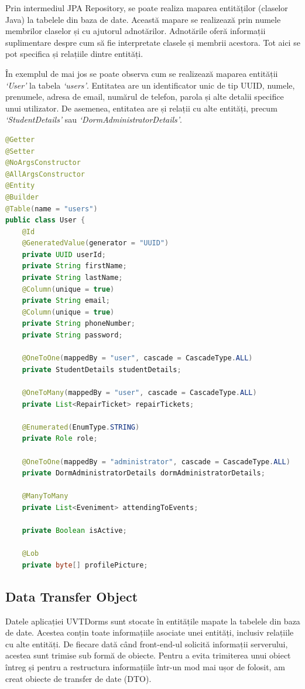 \documentclass[12pt,a4paper]{report}
\theoremstyle{definition}
\theoremstyle{remark}
\begin{document}
\par Prin intermediul JPA Repository, se poate realiza maparea entităților (claselor Java) la tabelele din baza de date. Această mapare se realizează prin numele membrilor claselor și cu ajutorul adnotărilor. Adnotările oferă informații suplimentare despre cum să fie interpretate clasele și membrii acestora. Tot aici se pot specifica și relațiile dintre entități.

\par În exemplul de mai jos se poate observa cum se realizează maparea entității \textit{`User'} la tabela \textit{`users'}. Entitatea are un identificator unic de tip UUID, numele, prenumele, adresa de email, numărul de telefon, parola și alte detalii specifice unui utilizator. De asemenea, entitatea are și relații cu alte entități, precum \textit{`StudentDetails'} sau \textit{`DormAdministratorDetails'}.

\begin{lstlisting}[language=Java, caption={Clasa User}]
@Getter
@Setter
@NoArgsConstructor
@AllArgsConstructor
@Entity
@Builder
@Table(name = "users")
public class User {
    @Id
    @GeneratedValue(generator = "UUID")
    private UUID userId;
    private String firstName;
    private String lastName;
    @Column(unique = true)
    private String email;
    @Column(unique = true)
    private String phoneNumber;
    private String password;

    @OneToOne(mappedBy = "user", cascade = CascadeType.ALL)
    private StudentDetails studentDetails;

    @OneToMany(mappedBy = "user", cascade = CascadeType.ALL)
    private List<RepairTicket> repairTickets;

    @Enumerated(EnumType.STRING)
    private Role role;

    @OneToOne(mappedBy = "administrator", cascade = CascadeType.ALL)
    private DormAdministratorDetails dormAdministratorDetails;

    @ManyToMany
    private List<Eveniment> attendingToEvents;

    private Boolean isActive;

    @Lob
    private byte[] profilePicture;
\end{lstlisting}

\subsection{Data Transfer Object}

\par Datele aplicației UVTDorms sunt stocate în entitățile mapate la tabelele din baza de date. Acestea conțin toate informațiile asociate unei entități, inclusiv relațiile cu alte entități. De fiecare dată când front-end-ul solicită informații serverului, acestea sunt trimise sub formă de obiecte. Pentru a evita trimiterea unui obiect întreg și pentru a restructura informațiile într-un mod mai ușor de folosit, am creat obiecte de transfer de date (DTO)\cite{pantaleev2007identifying}.
\end{document}
